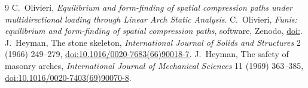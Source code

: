 \documentclass[fontsize=10.5pt,paper=a4,parskip=half,headings=normal,numbers=noenddot,
  open=any,bibliography=totoc,captions=tableheading]{scrreprt}
\numberwithin{figure}{chapter}
\numberwithin{table}{chapter}
\begin{document}
\renewcommand{\bibname}{References}
\begin{thebibliography}{9}
 C.~Olivieri, \emph{Equilibrium and form-finding of spatial compression paths under
multidirectional loading through Linear Arch Static Analysis}.
 C.~Olivieri, \emph{Funis: equilibrium and form-finding of spatial compression paths},
software, Zenodo, \href{https://doi.org/\FunisDOI}{doi:\FunisDOI}.
 J.~Heyman, The stone skeleton, \emph{International Journal of Solids and
Structures} 2 (1966) 249--279, \href{https://doi.org/10.1016/0020-7683(66)90018-7}{doi:10.1016/0020-7683(66)90018-7}.
 J.~Heyman, The safety of masonry arches, \emph{International Journal of
Mechanical Sciences} 11 (1969) 363--385,
\href{https://doi.org/10.1016/0020-7403(69)90070-8}{doi:10.1016/0020-7403(69)90070-8}.
\end{thebibliography}
\end{document}
